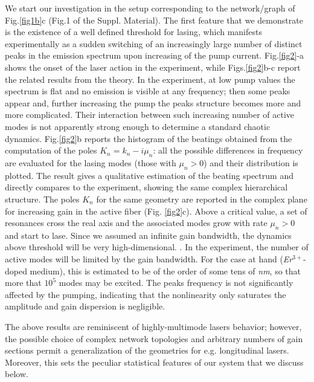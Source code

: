 \documentclass[aps,prl,twocolumn,showpacs,amsmath,amssymb,floatfix,superscriptaddress,
]{revtex4-1}
\begin{document}
We start our investigation in the setup corresponding to the network/graph of Fig.\ref{fig1b}c (Fig.1 of the Suppl. Material).  The first feature that we demonstrate is the existence of a well defined threshold for lasing, which manifests experimentally as a sudden switching of an increasingly large number of distinct peaks in the emission spectrum upon increasing of the pump current. Fig.\ref{fig2}-a shows the onset of the laser action in the experiment, while Figs.\ref{fig2}b-c report the related results from the theory. In the experiment, at low pump values the spectrum is flat and no emission is visible at any frequency; then some peaks appear and, further increasing the pump the peaks structure becomes more and more complicated. Their interaction between such increasing number of active modes is not apparently strong enough to determine a standard chaotic dynamics.
Fig.\ref{fig2}b reports the histogram of the beatings obtained from the computation of the poles $K_n=k_n-i\mu_n$: all the possible differences in frequency are evaluated for the lasing modes (those with $\mu_n>0$)  and their distribution is plotted. The result gives a qualitative estimation of the beating spectrum and directly compares to the experiment, showing the same complex hierarchical structure.
The poles $K_n$ for the same geometry are reported in the complex plane for increasing gain in the active fiber (Fig. \ref{fig2}c). Above a critical value, a set of resonances cross the real axis and the associated modes grow with rate $\mu_n>0$ and start to lase. Since we assumed an infinite gain bandwidth, the dynamics above threshold will be very high-dimensional.
\citep{kottos1999periodic}. In the experiment, the number of active modes will be limited by the gain bandwidth. For the case at hand ({\it Er$^{3+}$}-doped medium), this is estimated to be of the order of some tens of {\it nm}, so that more that $10^5$ modes may be excited. The peaks frequency is not significantly affected by the pumping, indicating that the nonlinearity only saturates the amplitude and gain dispersion is negligible.

The above results are reminiscent of highly-multimode lasers behavior; however, the possible choice of complex network topologies and arbitrary numbers of gain sections permit a generalization of the geometries for e.g. longitudinal lasers. Moreover, this sets the peculiar statistical features of our system that we discuss below.
\end{document}
